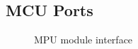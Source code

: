 \subsection{MCU Ports}
\label{mcu_ports}

\begin{figure}[h]
\caption{MPU module interface\label{mpu_symbol}}
\end{figure}

